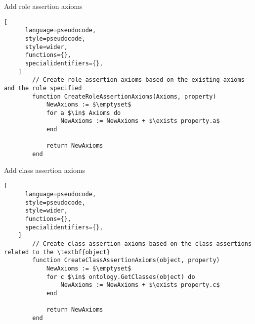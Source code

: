 \begin{programruledcaption}{Add role assertion axioms\label{prog:add-role-assertion-axioms}}
    \begin{lstlisting}[
      language=pseudocode,
      style=pseudocode,
      style=wider,
      functions={},
      specialidentifiers={},
    ]
        // Create role assertion axioms based on the existing axioms and the role specified
        function CreateRoleAssertionAxioms(Axioms, property) 
            NewAxioms := $\emptyset$
            for a $\in$ Axioms do
                NewAxioms := NewAxioms + $\exists property.a$
            end

            return NewAxioms
        end
    \end{lstlisting}
\end{programruledcaption}

\begin{programruledcaption}{Add class assertion axioms\label{prog:add-class-assertion-axioms}}
    \begin{lstlisting}[
      language=pseudocode,
      style=pseudocode,
      style=wider,
      functions={},
      specialidentifiers={},
    ]
        // Create class assertion axioms based on the class assertions related to the \textbf{object}
        function CreateClassAssertionAxioms(object, property) 
            NewAxioms := $\emptyset$
            for c $\in$ ontology.GetClasses(object) do
                NewAxioms := NewAxioms + $\exists property.c$
            end

            return NewAxioms
        end
    \end{lstlisting}
\end{programruledcaption}